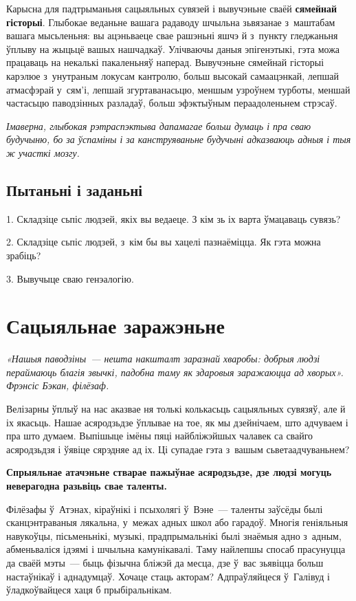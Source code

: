 Карысна для падтрыманьня сацыяльных сувязей і вывучэньне сваёй \textbf{сямейнай гісторыі}. Глыбокае веданьне вашага радаводу шчыльна зьвязанае з~маштабам вашага мысьленьня: вы ацэньваеце свае рашэньні яшчэ й з~пункту гледжаньня ўплыву на жыцьцё вашых нашчадкаў. Улічваючы даныя эпігенэтыкі, гэта можа працаваць на некалькі пакаленьняў наперад. Вывучэньне сямейнай гісторыі карэлюе з~унутраным локусам кантролю, больш высокай самаацэнкай, лепшай атмасфэрай у~сям'і, лепшай згуртаванасьцю, меншым узроўнем турботы, меншай частасьцю паводзінных разладаў, больш эфэктыўным пераадоленьнем стрэсаў.

\emph{Імаверна, глыбокая рэтраспэктыва дапамагае больш думаць і пра сваю будучыню, бо за ўспаміны і за канструяваньне будучыні адказваюць адныя і тыя ж участкі мозгу.}

\subsection*{Пытаньні і заданьні}

1. Складзіце сьпіс людзей, якіх вы ведаеце. З кім зь іх варта ўмацаваць сувязь?

2. Складзіце сьпіс людзей, з~кім бы вы хацелі пазнаёміцца. Як гэта можна зрабіць?

3. Вывучыце сваю генэалогію.


\section{Сацыяльнае заражэньне}

\emph{«Нашыя паводзіны~--- нешта накшталт заразнай хваробы: добрыя людзі пераймаюць благія звычкі, падобна таму як здаровыя заражаюцца ад хворых». Фрэнсіс Бэкан, філёзаф.} 

Велізарны ўплыў на нас аказвае ня толькі колькасьць сацыяльных сувязяў, але й іх якасьць. Нашае асяродзьдзе ўплывае на тое, як мы дзейнічаем, што адчуваем і пра што думаем. Выпішыце імёны пяці найбліжэйшых чалавек са свайго асяродзьдзя і ўявіце сярэдняе ад іх. Ці супадае гэта з~вашым сьветаадчуваньнем?

\textbf{Спрыяльнае атачэньне стварае пажыўнае асяродзьдзе, дзе людзі могуць неверагодна разьвіць свае таленты.}

Філёзафы ў~Атэнах, кіраўнікі і псыхолягі ў~Вэне~--- таленты заўсёды былі сканцэнтраваныя лякальна, у~межах адных школ або гарадоў. Многія геніяльныя навукоўцы, пісьменьнікі, музыкі, прадпрымальнікі былі знаёмыя адно з~адным, абменьваліся ідэямі і шчыльна камунікавалі. Таму найлепшы спосаб прасунуцца да сваёй мэты~--- быць фізычна бліжэй да месца, дзе ў~вас зьявіцца больш настаўнікаў і аднадумцаў. Хочаце стаць акторам? Адпраўляйцеся ў~Галівуд і ўладкоўвайцеся хаця б прыбіральнікам.

